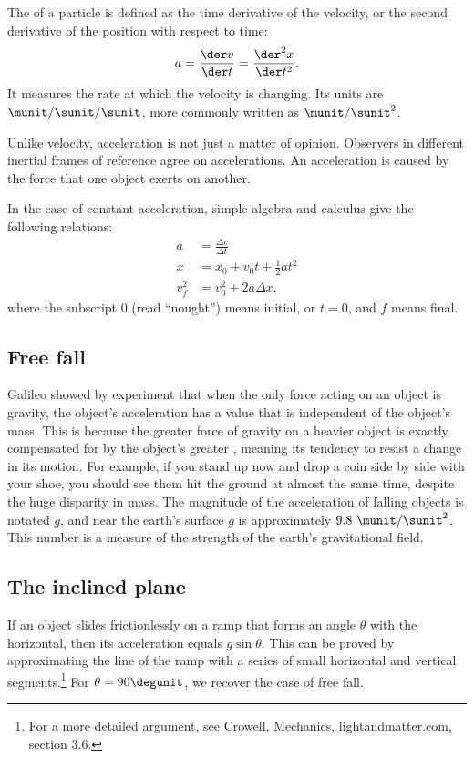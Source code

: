 The 
of a particle is defined as the time derivative of the velocity, or
the second derivative of the position with respect to time:
\begin{equation}
  a = \frac{\der v}{\der t} = \frac{\der^2 x}{\der t^2}.
\end{equation}
It measures the rate at which the velocity is changing.
Its units are $\munit/\sunit/\sunit$, more commonly written as $\munit/\sunit^2$.

Unlike velocity, acceleration is not just a matter of opinion.
Observers in different inertial frames of reference agree on accelerations.
An acceleration is caused by the force that one object exerts on another.

In the case of constant acceleration, simple algebra and calculus give the following relations:
\begin{align}
  a &= \frac{\Delta v}{\Delta t} \\
  x &= x_0+v_0t+\frac{1}{2}at^2 \\
  v_f^2 &= v_0^2 + 2a\Delta x,
\end{align}
where the subscript $0$ (read ``nought'') means initial, or $t=0$, and
$f$ means final.

\subsection{Free fall}

Galileo showed by experiment
that when the only force acting on an object is gravity, the object's acceleration
has a value that is independent of the object's mass. This is because the greater
force of gravity on a heavier object is exactly compensated for by the object's
greater , meaning its tendency to resist a change in its motion.
For example, if you stand up now and drop a coin side by side with your shoe, you
should see them hit the ground at almost the same time, despite the huge disparity
in mass. The magnitude of the acceleration of falling objects is notated 
$g$, and near the earth's
surface $g$ is approximately $9.8\ \munit/\sunit^2$. This number is a measure of
the strength of the earth's gravitational field.

\subsection{The inclined plane}\label{inclined-plane}
If an object slides frictionlessly on a ramp that forms an angle $\theta$ with the
horizontal, then its acceleration equals $g\sin\theta$. This can be proved by
approximating the line of the ramp with a series of small horizontal and vertical
segments.\footnote{For a more detailed argument, see Crowell, Mechanics, \url{lightandmatter.com}, section 3.6.}
For $\theta=90\degunit$, we recover the case of free fall.

